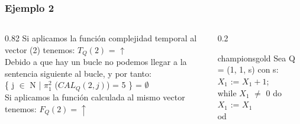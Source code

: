 \documentclass[xcolor=table]{beamer}
\begin{document}
\begin{frame}[fragile]\frametitle{Ejemplo 2} \scriptsize  

\begin{columns}

    \begin{column}{0.82\textwidth}
        Si aplicamos la función complejidad temporal al vector (2) tenemos: $T_Q(2)$ = $\uparrow$ \\
          \vspace{0.2cm}
        Debido a que hay un bucle no podemos llegar a la sentencia siguiente al bucle,
        y por tanto:\\ 
        \vspace{0.2cm}
        \{ j $\in$ N | $\pi^2_1$ ($CAL_Q(2, j)$) = 5 \} = $\emptyset$\\
          \vspace{0.2cm}
        Si aplicamos la función calculada al mismo vector tenemos: $F_Q(2) = \uparrow$

       
    \end{column}


    \begin{column}{0.2\textwidth}
        \begin{colorblock}[black]{championsgold}{}\scriptsize
        Sea Q = (1, 1, s) con s: \\
        \hspace{0.5cm}   $X_1$ := $X_1 + 1$;\\
        \hspace{0.5cm}   while $X_1$ $\neq$ 0 do \\
        \hspace{0.75cm}    $X_1$ := $X_1$\\
        \hspace{0.5cm}  od
        \end{colorblock}
    \end{column}
    
\end{columns}
        
\end{frame}
\end{document}
